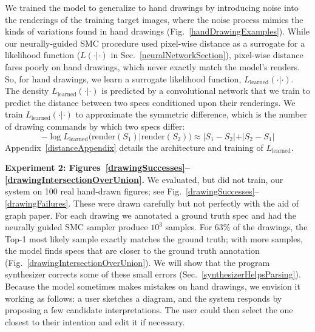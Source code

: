 \documentclass{article}
\theoremstyle{definition}
\begin{document}
 We trained the model
to generalize to hand drawings by introducing noise into the
renderings of the training target images, where the noise process  mimics the kinds of variations found in hand drawings (Fig.~\ref{handDrawingExamples}).
While our neurally-guided SMC procedure
used pixel-wise distance as a surrogate for a likelihood function ($L(\cdot|\cdot)$ in Sec.~\ref{neuralNetworkSection}),
 pixel-wise distance fares poorly on hand drawings, which never exactly match
the model's renders.
So, for hand drawings,
we learn a surrogate likelihood function,
$L_{\text{learned}}(\cdot|\cdot)$.
The density $L_{\text{learned}}(\cdot|\cdot)$ is predicted by a convolutional network that we train to predict
the distance between two specs conditioned upon their renderings.
We train $L_{\text{learned}}(\cdot |\cdot )$  to approximate the symmetric difference,
which is  the number of drawing commands by which two specs  differ:
  \begin{equation}
    -\log L_{\text{learned}}(\text{render}(S_1)|\text{render}(S_2))\approx |S_1 - S_2| + |S_2 - S_1|\label{symmetricDistance}
  \end{equation}
  Appendix~\ref{distanceAppendix} details the architecture and training of $L_{\text{learned}}$.




  \textbf{Experiment 2: Figures~\ref{drawingSuccesses}--\ref{drawingIntersectionOverUnion}.}
    We evaluated, but did not train, our system on 100 real hand-drawn figures; see Fig.~\ref{drawingSuccesses}--\ref{drawingFailures}.
    These were drawn carefully but not perfectly with the aid of graph paper.
    For each drawing we annotated a ground truth spec and had the neurally guided SMC sampler
produce $10^3$ samples. %
For 63\% of the drawings, the Top-1 most likely sample exactly matches the
ground truth; with more samples, the model finds specs
that are closer to the ground truth annotation (Fig.~\ref{drawingIntersectionOverUnion}).
We will show that the program synthesizer
corrects some of these small errors (Sec.~\ref{synthesizerHelpsParsing}).
Because the model sometimes makes mistakes on hand drawings,
we envision it working as follows:
a user sketches a diagram,
and the system responds by proposing a few candidate interpretations.
The user could then select the one closest to their intention and edit it if necessary.
\end{document}
